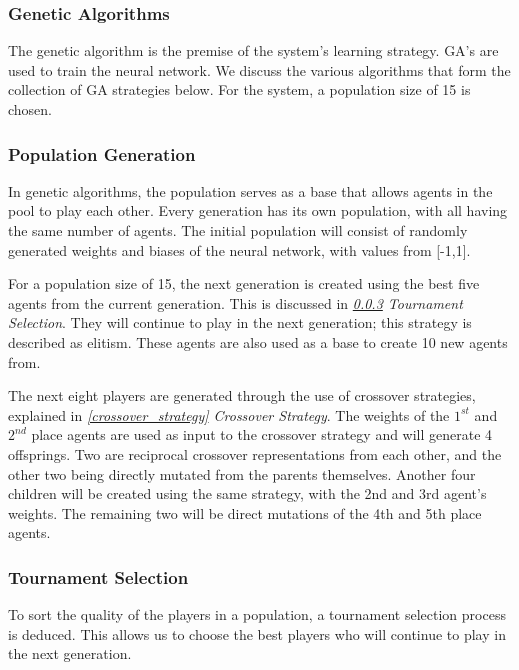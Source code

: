 \documentclass[12pt,a4paper]{article}
\begin{document}
\subsubsection{Genetic Algorithms} \label{genetic_algorithms}

    The genetic algorithm is the premise of the system's learning strategy. GA's are used to train the neural network. We discuss the various algorithms that form the collection of GA strategies below. For the system, a population size of 15 is chosen.

    


\subsubsection{Population Generation} \label{population_generation}
    In genetic algorithms, the population serves as a base that allows agents in the pool to play each other. Every generation has its own population, with all having the same number of agents. The initial population will consist of randomly generated weights and biases of the neural network, with values from [-1,1]. 
    
    For a population size of 15, the next generation is created using the best five agents from the current generation. This is discussed in {\it{\ref{tournament_selection} Tournament Selection}}. 
    They will continue to play in the next generation; this strategy is described as elitism. These agents are also used as a base to create 10 new agents from. 
    
    The next eight players are generated through the use of crossover strategies, explained in {\it{\ref{crossover_strategy} Crossover Strategy}}. The weights of the $1^{st}$ and $2^{nd}$ place agents are used as input to the crossover strategy and will generate 4 offsprings. Two are reciprocal crossover representations from each other, and the other two being directly mutated from the parents themselves. Another four children will be created using the same strategy, with the 2nd and 3rd agent's weights. The remaining two will be direct mutations of the 4th and 5th place agents.

\subsubsection{Tournament Selection} \label{tournament_selection}

    To sort the quality of the players in a population, a tournament selection process is deduced. This allows us to choose the best players who will continue to play in the next generation.
\end{document}

